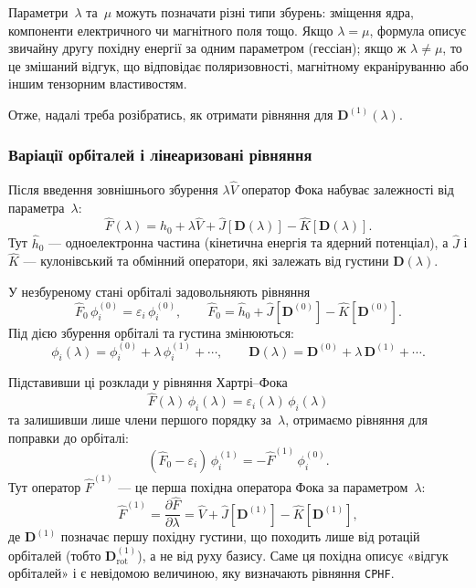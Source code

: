


Параметри~$\lambda$ та~$\mu$ можуть позначати різні типи збурень:
зміщення ядра, компоненти електричного чи магнітного поля тощо.
Якщо \(\lambda=\mu\), формула описує звичайну другу похідну енергії
за одним параметром (гессіан);
якщо ж \(\lambda\neq\mu\), то це змішаний відгук,
що відповідає поляризовності, магнітному екраніруванню або іншим тензорним властивостям.

Отже, надалі треба розібратись, як отримати рівняння для  $\mathbf D^{(1)}(\lambda)$.


\subsubsection{Варіації орбіталей і лінеаризовані рівняння}

Після введення зовнішнього збурення \(\lambda \hat V\) оператор Фока набуває залежності від параметра~$\lambda$:
\[
\hat F(\lambda) = \hat h_0 + \lambda \hat V + \hat J[\mathbf D(\lambda)] - \hat K[\mathbf D(\lambda)].
\]
Тут \(\hat h_0\) --- одноелектронна частина (кінетична енергія та ядерний потенціал),
а \(\hat J\) і \(\hat K\) --- кулонівський та обмінний оператори, які залежать від густини \(\mathbf D(\lambda)\).

У незбуреному стані орбіталі задовольняють рівняння
\[
\hat F_0\,\phi_i^{(0)} = \varepsilon_i\,\phi_i^{(0)},
\qquad
\hat F_0 = \hat h_0 + \hat J[\mathbf D^{(0)}] - \hat K[\mathbf D^{(0)}].
\]
Під дією збурення орбіталі та густина змінюються:
\[
\phi_i(\lambda) = \phi_i^{(0)} + \lambda\,\phi_i^{(1)} + \cdots,
\qquad
\mathbf D(\lambda) = \mathbf D^{(0)} + \lambda\,\mathbf D^{(1)} + \cdots.
\]

Підставивши ці розклади у рівняння Хартрі–Фока
\[
\hat F(\lambda)\,\phi_i(\lambda) = \varepsilon_i(\lambda)\,\phi_i(\lambda)
\]
та залишивши лише члени першого порядку за~$\lambda$, отримаємо рівняння для поправки до орбіталі:
\begin{equation}\label{eq:F(1)}
(\hat F_0 - \varepsilon_i)\,\phi_i^{(1)} = -\hat F^{(1)}\,\phi_i^{(0)}.
\end{equation}
Тут оператор \(\hat F^{(1)}\) --- це перша похідна оператора Фока за параметром~$\lambda$:
\[
\hat F^{(1)} = \frac{\partial \hat F}{\partial \lambda}
= \hat V + \hat J[\mathbf D^{(1)}] - \hat K[\mathbf D^{(1)}],
\]
%
де $\mathbf D^{(1)}$ позначає першу похідну густини,
що походить лише від ротацій орбіталей (тобто $\mathbf D^{(1)}_{\text{rot}}$),
а не від руху базису.
Саме ця похідна описує «відгук орбіталей» і є невідомою величиною,
яку визначають рівняння \texttt{CPHF}.

